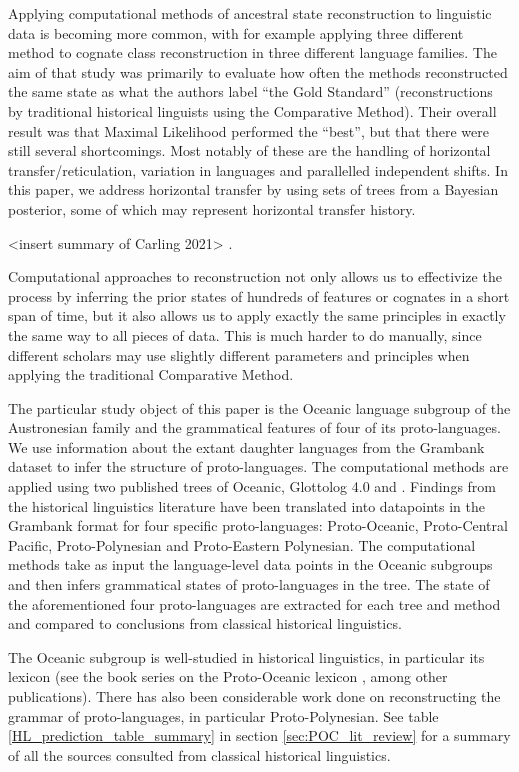 \documentclass[draft,10pt]{article} %
\begin{document}
Applying computational methods of ancestral state reconstruction to linguistic data is becoming more common, with for example \citet{jager2018using} applying three different method to cognate class reconstruction in three different language families. The aim of that study was primarily to evaluate how often the methods reconstructed the same state as what the authors label ``the Gold Standard'' (reconstructions by traditional historical linguists using the Comparative Method). Their overall result was that Maximal Likelihood performed the ``best'', but that there were still several shortcomings. Most notably of these are the handling of horizontal transfer/reticulation, variation in languages and parallelled independent shifts. In this paper, we address horizontal transfer by using sets of trees from a Bayesian posterior, some of which may represent horizontal transfer history.

<insert summary of Carling 2021> \citet{carling2021reconstructing}. 

Computational approaches to reconstruction not only allows us to effectivize the process by inferring the prior states of hundreds of features or cognates in a short span of time, but it also allows us to apply exactly the same principles in exactly the same way to all pieces of data. This is much harder to do manually, since different scholars may use slightly different parameters and principles when applying the traditional Comparative Method. 

The particular study object of this paper is the Oceanic language subgroup of the Austronesian family and the grammatical features of four of its proto-languages. We use information about the extant daughter languages from the Grambank dataset \citep{grambankwebsite} to infer the structure of proto-languages. The computational methods are applied using two published trees of Oceanic, Glottolog 4.0 and \citet{grayetal_2009}. Findings from the historical linguistics literature have been translated into datapoints in the Grambank format for four specific proto-languages: Proto-Oceanic, Proto-Central Pacific, Proto-Polynesian and Proto-Eastern Polynesian. The computational methods take as input the language-level data points in the Oceanic subgroups and then infers grammatical states of proto-languages in the tree. The state of the aforementioned four proto-languages are extracted for each tree and method and compared to conclusions from classical historical linguistics.

The Oceanic subgroup is well-studied in historical linguistics, in particular its lexicon (see the book series on the Proto-Oceanic lexicon \citep{protooceanicvol1, protooceanicvol2, protooceanicvol3, protooceanicvol4, protooceanicvol5}, among other publications). There has also been considerable work done on reconstructing the grammar of proto-languages, in particular Proto-Polynesian. See table \ref{HL_prediction_table_summary} in section \ref{sec:POC_lit_review} for a summary of all the sources consulted from classical historical linguistics.
\end{document}

